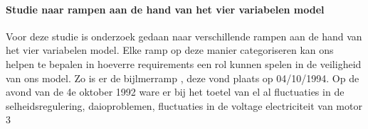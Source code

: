 \paragraph{Studie naar rampen aan de hand van het vier variabelen model}
\newline \indent Voor deze studie is onderzoek gedaan naar verschillende rampen aan de hand van het vier variabelen model.
Elke ramp op deze manier categoriseren  kan ons helpen te bepalen in hoeverre requirements een rol kunnen spelen in de veiligheid van ons model.  Zo is er de bijlmerramp \cite{aviationsafety04101992airplaneCrashBijlmer}
, deze vond plaats op 04/10/1994. 
Op de avond van de 4e oktober 1992 ware er bij het toetel van el al fluctuaties in de selheidsregulering, daioproblemen, fluctuaties in de voltage electriciteit van motor 3
